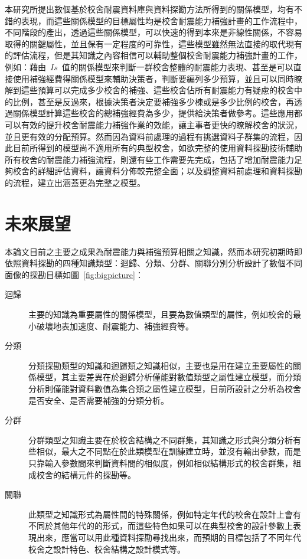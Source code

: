 本研究所提出數個基於校舍耐震資料庫與資料探勘方法所得到的關係模型，均有不錯的表現，而這些關係模型的目標屬性均是校舍耐震能力補強計畫的工作流程中，不同階段的產出，透過這些關係模型，可以快速的得到本來是非線性關係，不容易取得的關鍵屬性，並且保有一定程度的可靠性，這些模型雖然無法直接的取代現有的評估流程，但是其知識之內容相信可以輔助整個校舍耐震能力補強計畫的工作，例如：藉由~$Is$~值的關係模型來判斷一群校舍整體的耐震能力表現、甚至是可以直接使用補強經費得關係模型來輔助決策者，判斷要編列多少預算，並且可以同時瞭解到這些預算可以完成多少校舍的補強、這些校舍佔所有耐震能力有疑慮的校舍中的比例，甚至是反過來，根據決策者決定要補強多少棟或是多少比例的校舍，再透過關係模型計算這些校舍的總補強經費為多少，提供給決策者做參考。這些應用都可以有效的提升校舍耐震能力補強作業的效能，讓主事者更快的瞭解校舍的狀況，並且更有效的分配預算。然而因為資料前處理的過程有挑選資料子群集的流程，因此目前所得到的模型尚不適用所有的典型校舍，如欲完整的使用資料探勘技術輔助所有校舍的耐震能力補強流程，則還有些工作需要先完成，包括了增加耐震能力足夠校舍的詳細評估資料，讓資料分佈較完整全面；以及調整資料前處理和資料探勘的流程，建立出涵蓋更為完整之模型。

\section{未來展望} 

本論文目前之主要之成果為耐震能力與補強預算相關之知識，然而本研究初期時即依照資料探勘的四種知識類型：迴歸、分類、分群、關聯分別分析設計了數個不同面像的探勘目標如圖~\ref{fig:bigpicture}：

\begin{description}
  \item[迴歸]
  主要的知識為重要屬性的關係模型，且要為數值類型的屬性，例如校舍的最小破壞地表加速度、耐震能力、補強經費等。
  \item[分類]
  分類探勘類型的知識和迴歸類之知識相似，主要也是用在建立重要屬性的關係模型，其主要差異在於迴歸分析僅能對數值類型之屬性建立模型，而分類分析則僅能對資料數值為集合類之屬性建立模型，目前所設計之分析為校舍是否安全、是否需要補強的分類分析。
  \item[分群]
  分群類型之知識主要在於校舍結構之不同群集，其知識之形式與分類分析有些相似，最大之不同點在於此類模型在訓練建立時，並沒有輸出參數，而是只靠輸入參數間來判斷資料間的相似度，例如相似結構形式的校舍群集，組成校舍的結構元件的探勘等。
  \item[關聯]
  此類型之知識形式為屬性間的特殊關係，例如特定年代的校舍在設計上會有不同於其他年代的的形式，而這些特色如果可以在典型校舍的設計參數上表現出來，應當可以用此種資料探勘尋找出來，而預期的目標包括了不同年代校舍之設計特色、校舍結構之設計模式等。
\end{description}


